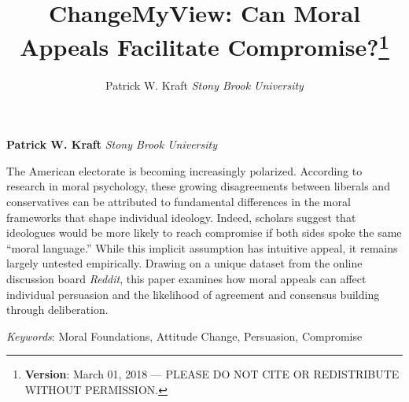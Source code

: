 \documentclass[12pt,]{article}
\title{ChangeMyView: Can Moral Appeals Facilitate Compromise?\thanks{\textbf{Version}: March 01, 2018 --- PLEASE DO NOT CITE OR REDISTRIBUTE
WITHOUT PERMISSION.}  }
\author{\Large Patrick W. Kraft\vspace{0.05in} \newline\normalsize\emph{Stony Brook University}  }
\date{}
\newcommand*{\authorfont}{\fontfamily{phv}\selectfont}
\renewenvironment{abstract}
 {{%
    \setlength{\leftmargin}{0mm}
    \setlength{\rightmargin}{\leftmargin}%
  }%
  \relax}
 {\endlist}
\begin{document}
	
%

{%
\setlength{\parindent}{0pt}
\thispagestyle{plain}
{\fontsize{18}{20}\selectfont\raggedright 
\maketitle  %

}

{
   \vskip 13.5pt\relax \normalsize\fontsize{11}{12} 
\textbf{\authorfont Patrick W. Kraft} \hskip 15pt \emph{\small Stony Brook University}   

}

}








\begin{abstract}

    \hbox{\vrule height .2pt width 39.14pc}

    \vskip 8.5pt %

\noindent The American electorate is becoming increasingly polarized. According to
research in moral psychology, these growing disagreements between
liberals and conservatives can be attributed to fundamental differences
in the moral frameworks that shape individual ideology. Indeed, scholars
suggest that ideologues would be more likely to reach compromise if both
sides spoke the same ``moral language.'' While this implicit assumption
has intuitive appeal, it remains largely untested empirically. Drawing
on a unique dataset from the online discussion board \emph{Reddit}, this
paper examines how moral appeals can affect individual persuasion and
the likelihood of agreement and consensus building through deliberation.


\vskip 8.5pt \noindent \emph{Keywords}: Moral Foundations, Attitude Change, Persuasion, Compromise \par

    \hbox{\vrule height .2pt width 39.14pc}



\end{abstract}


\vskip 6.5pt
\end{document}
